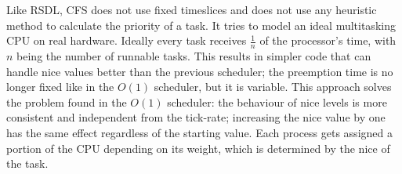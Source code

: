 Like RSDL, CFS does not use fixed timeslices and does not use any heuristic
method to calculate the priority of a task. It tries to model an ideal
multitasking CPU on real hardware. Ideally every task receives
$\frac 1n$ of the processor's time, with $n$ being the number of
runnable tasks. This results in simpler code that can handle nice
values better than the previous scheduler; the preemption time is no
longer fixed like in the $O(1)$ scheduler, but it is variable.\cite{cfs_design} This approach solves the problem found in the $O(1)$ scheduler: the behaviour of nice levels is more consistent and independent from the tick-rate; increasing the nice value by one has the same effect regardless of the starting value. Each process gets
assigned a portion of the CPU depending on its weight, which is
determined by the nice of the task. %

